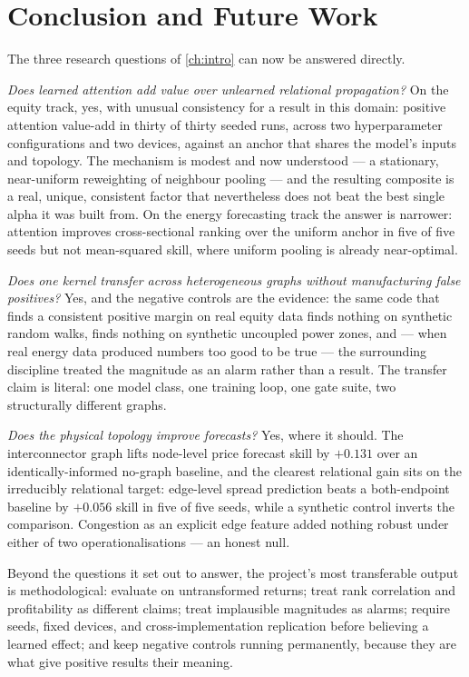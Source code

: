 \chapter{Conclusion and Future Work}
\label{ch:conclusion}

The three research questions of \cref{ch:intro} can now be answered
directly.

\emph{Does learned attention add value over unlearned relational
propagation?} On the equity track, yes, with unusual consistency for a
result in this domain: positive attention value-add in thirty of thirty
seeded runs, across two hyperparameter configurations and two devices,
against an anchor that shares the model's inputs and topology. The
mechanism is modest and now understood --- a stationary, near-uniform
reweighting of neighbour pooling --- and the resulting composite is a
real, unique, consistent factor that nevertheless does not beat the best
single alpha it was built from. On the energy forecasting track the
answer is narrower: attention improves cross-sectional ranking over the
uniform anchor in five of five seeds but not mean-squared skill, where
uniform pooling is already near-optimal.

\emph{Does one kernel transfer across heterogeneous graphs without
manufacturing false positives?} Yes, and the negative controls are the
evidence: the same code that finds a consistent positive margin on real
equity data finds nothing on synthetic random walks, finds nothing on
synthetic uncoupled power zones, and --- when real energy data produced
numbers too good to be true --- the surrounding discipline treated the
magnitude as an alarm rather than a result. The transfer claim is
literal: one model class, one training loop, one gate suite, two
structurally different graphs.

\emph{Does the physical topology improve forecasts?} Yes, where it
should. The interconnector graph lifts node-level price forecast skill
by $+0.131$ over an identically-informed no-graph baseline, and the
clearest relational gain sits on the irreducibly relational target:
edge-level spread prediction beats a both-endpoint baseline by $+0.056$
skill in five of five seeds, while a synthetic control inverts the
comparison. Congestion as an explicit edge feature added nothing robust
under either of two operationalisations --- an honest null.

Beyond the questions it set out to answer, the project's most
transferable output is methodological: evaluate on untransformed
returns; treat rank correlation and profitability as different claims;
treat implausible magnitudes as alarms; require seeds, fixed devices,
and cross-implementation replication before believing a learned effect;
and keep negative controls running permanently, because they are what
give positive results their meaning.

